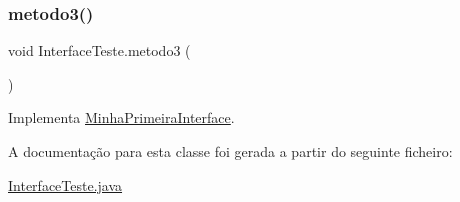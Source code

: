 \subsubsection{\texorpdfstring{metodo3()}{metodo3()}}
{\footnotesize\ttfamily void Interface\+Teste.\+metodo3 (\begin{DoxyParamCaption}{ }\end{DoxyParamCaption})\hspace{0.3cm}{\ttfamily [inline]}}



Implementa \hyperlink{interface_minha_primeira_interface_a8cc4c146a3231985c6c31eb5c1e5d709}{Minha\+Primeira\+Interface}.



A documentação para esta classe foi gerada a partir do seguinte ficheiro\+:\begin{DoxyCompactItemize}
\item 
\hyperlink{_interface_teste_8java}{Interface\+Teste.\+java}\end{DoxyCompactItemize}
